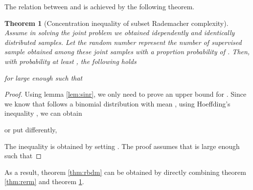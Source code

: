 \documentclass[letterpaper]{article}
\newtheorem{theorem}{Theorem}
\begin{document}
The relation between  and  is achieved by the following theorem.

\begin{theorem}[Concentration inequality of subset Rademacher complexity]
  \label{thm:subr}
  Assume in solving the joint problem we obtained  idependently and identically distributed samples. Let the random number  represent the number of supervised sample obtained among these  joint samples with a proprtion probability of . Then, with probability at least , the following holds
  
  for large enough  such that
  
\end{theorem}

\begin{proof}
  Using lemma \ref{lem:sinr}, we only need to prove an upper bound for . Since we know that  follows a binomial distribution with mean , using Hoeffding's inequality \cite{H63} \cite{S74}, we can obtain
  
  or put differently,
  
  The inequality is obtained by setting . The proof assumes that  is large enough such that
  
\end{proof}

As a result, theorem \ref{thm:rbdm} can be obtained by directly combining theorem \ref{thm:rerm} and theorem \ref{thm:subr}.
\end{document}
